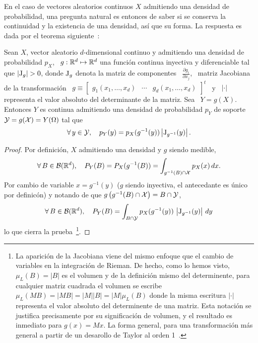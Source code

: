 En  el caso  de vectores  aleatorios continuos  $X$ admitiendo  una  densidad de
probabilidad,  una pregunta  natural  es entonces  de  saber si  se conserva  la
continuidad y la existencia de una densidad, as\'i que su forma. La respuesta es
dada por el teorema siguiente~\cite{Bre88, JacPro03, AthLah06, Coh13, HogMck13}:
%
\begin{teorema}
\label{Teo:MP:TransformacionInyectivaDensidad}
%
  Sean $X$, vector aleatorio  $d$-dimensional continuo y admitiendo una densidad
  de probabilidad  $p_X$, \ $g:\mathbb{R}^d  \mapsto \mathbb{R}^d$ una  funci\'on continua
  inyectiva y diferenciable tal que
 $\left| \operatorname{J}_g \right| > 0$,
 donde $\operatorname{J}_g$ denota la  matriz de componentes \ $\frac{\partial g_i}{\partial
   x_j}$, \ matriz Jacobiana de  la transformaci\'on \ $g \equiv \begin{bmatrix}
   g_1(x_1 , \ldots , x_d) & \cdots & g_d(x_1 , \ldots , x_d) \end{bmatrix}^t$ \
 y \ $|\cdot|$ representa el valor absoluto del determinante de la matriz. Sea \
 $Y = g(X)$.   Entonces $Y$ es continua admitiendo  una densidad de probabilidad
 $p_Y$ de soporte $\mathcal{Y} = g(\mathcal{X}) = Y(\Omega)$ tal que
  \[
  \forall \,  y \in  \mathcal{Y}, \quad p_Y(y)  = p_X(g^{-1}(y))  \left| \operatorname{J}_{g^{-1}}(y)
  \right|.
  \]
\end{teorema}
%
\begin{proof}
  Por definici\'on, $X$ admitiendo una densidad y $g$ siendo medible,
  \[
  \forall \, B \in \mathcal{B}(\mathbb{R}^d),  \quad P_Y(B) = P_X(g^{-1}(B)) = \int_{g^{-1}(B)
    \cap \mathcal{X}} p_X(x) \, dx.
  \]
  Por cambio de  variable $x = g^{-1}(y)$ ($g$  siendo inyectiva, el antecedante
  es  \'unico por  definic\'on)  y notando  de  que $g\left(  g^{-1}(B) \cap  \mathcal{X}
  \right) = B \cap \mathcal{Y}$,
  \[
  \forall \, B  \in \mathcal{B}(\mathbb{R}^d), \quad P_Y(B) =  \int_{B \cap \mathcal{Y}} p_X(g^{-1}(y))
  \, \left| \operatorname{J}_{g^{-1}}(y) \right| \, dy
  \]
  lo que  cierra la  prueba~\footnote{La aparici\'on de  la Jacobiana  viene del
    mismo enfoque que  el cambio de variables en la  integraci\'on de Rieman. De
    hecho,  como  lo hemos  visto,  $\mu_L(B)  = |B|$  es  el  volumen  y de  la
    definici\'on  mismo  del determinente,  para  cualquier  matriz cuadrada  el
    volumen se escribe \ $\mu_L(M B) = |M  B| = |M| |B| = |M| \mu_L(B)$ donde la
    misma escritura  $|\cdot|$ representa el valor absoluto  del determinente de
    una matriz. Esta notaci\'on se justifica precisamente por su significaci\'on
    de  volumen, y  el  resultado es  inmediato para  $g(x)  = M  x$.  La  forma
    general, para una transformaci\'on m\'as general a partir de un desarollo de
    Taylor al orden 1~\cite{AthLah06, Coh13}.}.
\end{proof}


